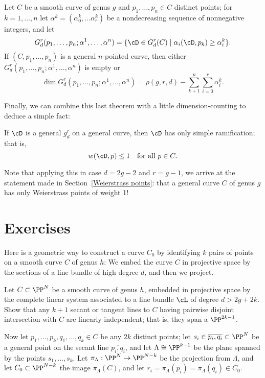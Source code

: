 \begin{theorem}\label{BN with inflection and dimension}
Let $C$ be a smooth curve of genus $g$ and $p_1,\dots,p_n \in C$ distinct points; for $k = 1,\dots,n$ let $\alpha^k = (\alpha^k_0,\dots\alpha^k_r)$ be a nondecreasing sequence of nonnegative integers, and let
$$
G^r_d(p_1,\dots,p_n; \alpha^1,\dots,\alpha^n) = \{\cD \in G^r_d(C) \mid \alpha_i(\cD, p_k) \geq \alpha^k_i \}.
$$
If $(C, p_1,\dots,p_n)$ is a general $n$-pointed curve, then either $G^r_d(p_1,\dots,p_n; \alpha^1,\dots,\alpha^n)$ is empty or
$$
\dim G^r_d(p_1,\dots,p_n; \alpha^1,\dots,\alpha^n) = \rho(g,r,d) - \sum_{k+1}^n \sum_{i=0}^r \alpha^k_i.
$$
\end{theorem}

Finally, we can combine this last theorem with a little dimension-counting to deduce a simple fact:

\begin{theorem}
If $\cD$ is a general $g^r_d$ on a general curve, then $\cD$ has only simple ramification; that is,	
$$
w(\cD, p) \leq 1 \quad \text{for all } p \in C.
$$
\end{theorem}

Note that applying this in case $d=2g-2$ and $r = g-1$, we arrive at the statement made in Section~\ref{Weierstrass points}: that a general curve $C$ of genus $g$ has only Weierstrass points of weight 1!

\section{Exercises}


Here is a geometric way to construct a curve $C_0$ by identifying $k$ pairs of points on a smooth curve $C$ of genus $h$: We embed the curve $C$ in projective space by the sections of a line bundle of high degree $d$, and then we project.

\begin{exercise}\label{independent secants} Let $C \subset \PP^N$ be a smooth curve of genus $h$, embedded in projective space by the complete linear system associated to a line bundle $\cL$ of degree $d > 2g + 2k$. Show that any $k+1$ secant or tangent lines to $C$  having pairwise disjoint intersection with $C$ are linearly independent; that is, they span a $\PP^{2k-1}$.
\end{exercise}

Now let $p_1,\dots,p_k, q_1,\dots, q_k \in C$ be any $2k$ distinct points; let $s_i \in \overline{p_i,q_i} \subset \PP^N$ be a general point on the secant line $\overline{p_i,q_i} $, and let $\Lambda \cong \PP^{k-1}$ be the plane spanned by the points $s_1,\dots,s_k$. Let $\pi_\Lambda : \PP^N \to \PP^{N-k}$ be the projection from $\Lambda$, and let $C_0 \subset \PP^{N-k}$ the image $\pi_\Lambda(C)$, and let $r_i = \pi_\Lambda(p_i) = \pi_\Lambda(q_i) \in C_0$.

